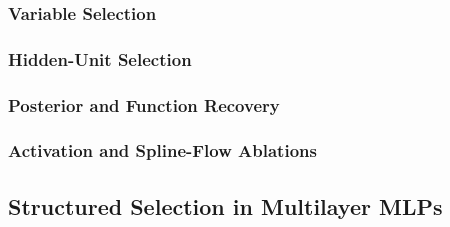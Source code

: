 \documentclass{article}
\begin{document}
\subsubsection{Variable Selection}
\label{sec:shallow_feature}

%
%
%


\subsubsection{Hidden-Unit Selection}
\label{sec:shallow_unit}

%
%
%


\subsubsection{Posterior and Function Recovery}
\label{sec:shallow_recovery}

%
%
%
%
%
%


\subsubsection{Activation and Spline-Flow Ablations}
\label{sec:shallow_ablation}

%
%
%
%



\subsection{Structured Selection in Multilayer MLPs}
\label{sec:mlp}
\end{document}
